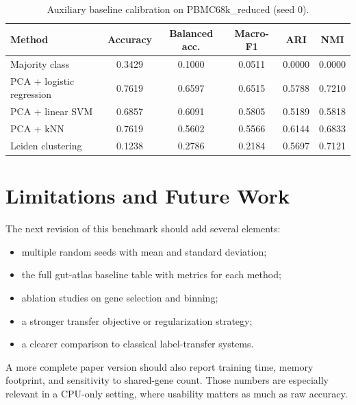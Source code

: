 \documentclass[11pt]{article}
\begin{document}
\begin{table}[H]
\centering
\caption{Auxiliary baseline calibration on PBMC68k\_reduced (seed 0).}
\label{tab:pbmc-baselines}
\begin{tabular}{lccccc}
\toprule
Method & Accuracy & Balanced acc. & Macro-F1 & ARI & NMI \\
\midrule
Majority class & 0.3429 & 0.1000 & 0.0511 & 0.0000 & 0.0000 \\
PCA + logistic regression & 0.7619 & 0.6597 & 0.6515 & 0.5788 & 0.7210 \\
PCA + linear SVM & 0.6857 & 0.6091 & 0.5805 & 0.5189 & 0.5818 \\
PCA + kNN & 0.7619 & 0.5602 & 0.5566 & 0.6144 & 0.6833 \\
Leiden clustering & 0.1238 & 0.2786 & 0.2184 & 0.5697 & 0.7121 \\
\bottomrule
\end{tabular}
\end{table}

\section{Limitations and Future Work}
The next revision of this benchmark should add several elements:
\begin{itemize}[leftmargin=1.2em]
  \item multiple random seeds with mean and standard deviation;
  \item the full gut-atlas baseline table with metrics for each method;
  \item ablation studies on gene selection and binning;
  \item a stronger transfer objective or regularization strategy;
  \item a clearer comparison to classical label-transfer systems.
\end{itemize}

A more complete paper version should also report training time, memory footprint, and sensitivity to shared-gene count.
Those numbers are especially relevant in a CPU-only setting, where usability matters as much as raw accuracy.
\end{document}
